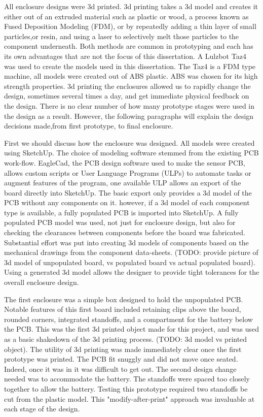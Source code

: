 All enclosure designs were 3d printed. 3d printing takes a 3d model and creates it either out of an extruded material such as plastic or wood, a process known as Fused Deposition Modeling (FDM), or by repeatedly adding a thin layer of small particles,or resin, and using a laser to selectively melt those particles to the component underneath. Both methods are common in prototyping and each has its own advantages that are not the focus of this dissertation. A Lulzbot Taz4 was used to create the models used in this dissertation. The Taz4 is a FDM type machine, all models were created out of ABS plastic. ABS was chosen for its high strength properties. 3d printing the enclosures allowed us to rapidly change the design, sometimes several times a day, and get immediate physical feedback on the design. There is no clear number of how many prototype stages were used in the design as a result. However, the following paragraphs will explain the design decisions made,from first prototype, to final enclosure.

First we should discuss how the enclosure was designed. All models were created using SketchUp. The choice of modeling software stemmed from the existing PCB work-flow. EagleCad, the PCB design software used to make the sensor PCB, allows custom scripts or User Language Programs (ULPs) to automate tasks or augment features of the program, one available ULP allows an export of the board directly into SketchUp. The basic export only provides a 3d model of the PCB without any components on it. however, if a 3d model of each component type is available, a fully populated PCB is imported into SketchUp. A fully populated PCB model was used, not just for enclosure design, but also for checking the clearances between components before the board was fabricated. Substantial effort was put into creating 3d models of components based on the mechanical drawings from the component data-sheets. (TODO: provide picture of 3d model of unpopulated board, vs populated board vs actual populated board). Using a generated 3d model allows the designer to provide tight tolerances for the overall enclosure design. 

The first enclosure was a simple box designed to hold the unpopulated PCB. Notable features of this first board included retaining clips above the board, rounded corners, integrated standoffs, and a compartment for the battery below the PCB. This was the first 3d printed object made for this project, and was used as a basic shakedown of the 3d printing process. (TODO: 3d model vs printed object). The utility of 3d printing was made immediately clear once the first prototype was printed. The PCB fit snuggly and did not move once seated. Indeed, once it was in it was difficult to get out. The second design change needed was to accommodate the battery. The standoffs were spaced too closely together to allow the battery. Testing this prototype  required two standoffs be cut from the plastic model. This "modify-after-print" approach was invaluable at each stage of the design.

